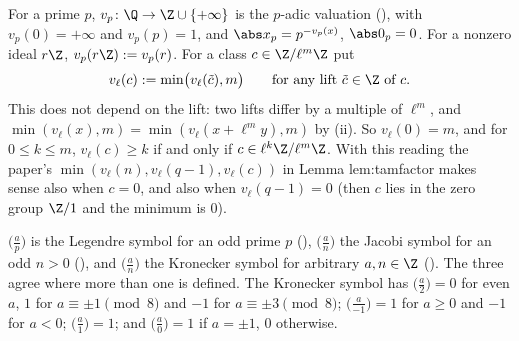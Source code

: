 \begin{convention}[valuations]\label{conv:rings:valuations}
For a prime $p$, $v_p\colon\Q\to\Z\cup\{+\infty\}$ is the $p$-adic valuation (), with
$v_p(0)=+\infty$ and $v_p(p)=1$, and $\abs x_p=p^{-v_p(x)}$, $\abs0_p=0$. For a nonzero ideal $r\Z$, $v_p(r\Z):=v_p(r)$. For a class
$c\in\Z/\ell^m\Z$ put
\[
v_\ell(c):=\min\bigl(v_\ell(\tilde c),m\bigr)\qquad\text{for any lift }\tilde c\in\Z\text{ of }c.
\]
This does not depend on the lift: two lifts differ by a multiple of $\ell^m$, and $\min(v_\ell(x),m)=\min(v_\ell(x+\ell^my),m)$ by
(ii). So $v_\ell(0)=m$, and for $0\le k\le m$, $v_\ell(c)\ge k$ if and only if $c\in\ell^k\Z/\ell^m\Z$. With this
reading the paper's $\min(v_\ell(n),v_\ell(q-1),v_\ell(c))$ in Lemma lem:tamfactor makes sense also when $c=0$, and also when
$v_\ell(q-1)=0$ (then $c$ lies in the zero group $\Z/1$ and the minimum is $0$).
\end{convention}

\begin{convention}[symbols]\label{conv:rings:symbols}
$\bigl(\frac ap\bigr)$ is the Legendre symbol for an odd prime $p$ (), $\bigl(\frac an\bigr)$ the Jacobi symbol for an odd
$n>0$ (), and $\bigl(\frac an\bigr)$ the Kronecker symbol for arbitrary $a,n\in\Z$ (). The three agree
where more than one is defined. The Kronecker symbol has $\bigl(\frac a2\bigr)=0$ for even $a$, $1$ for $a\equiv\pm1\pmod8$ and $-1$ for
$a\equiv\pm3\pmod8$; $\bigl(\frac a{-1}\bigr)=1$ for $a\ge0$ and $-1$ for $a<0$; $\bigl(\frac a1\bigr)=1$; and $\bigl(\frac a0\bigr)=1$ if $a=\pm1$, $0$ otherwise.
\end{convention}

